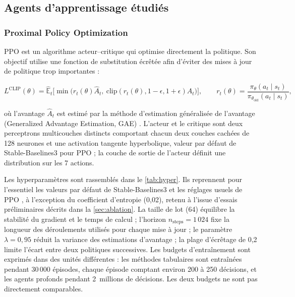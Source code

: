 \documentclass[11pt,a4paper]{article}
\newif\ifrevmarks
\newcommand{\revtag}[1]{\ifrevmarks\textsuperscript{\textcolor{red!70!black}{\scriptsize[#1]}}\fi}
\newcommand{\rev}[2]{\ifrevmarks{\color{revcolor}#2}\revtag{#1}\else#2\fi}
\newenvironment{revbloc}[1]{\par\ifrevmarks\color{revcolor}\noindent\revtag{#1}\ \fi}{\par}
\begin{document}
\subsection{Agents d'apprentissage étudiés}
\label{sec:agents}

\subsubsection{Proximal Policy Optimization}

PPO \cite{JohnSchulman2017} est un algorithme acteur--critique qui optimise directement la politique. Son objectif utilise une fonction de substitution écrêtée afin d'éviter des mises à jour de politique trop importantes :

\begin{equation}
L^{\mathrm{CLIP}}(\theta) = \hat{\mathbb{E}}_t \Big[ \min \big( r_t(\theta)\hat{A}_t,\ \mathrm{clip}(r_t(\theta), 1-\epsilon, 1+\epsilon)\hat{A}_t \big) \Big],
\qquad r_t(\theta) = \frac{\pi_\theta(a_t \mid s_t)}{\pi_{\theta_{\mathrm{old}}}(a_t \mid s_t)} ,
\end{equation}

\rev{Bibliographie}{où l'avantage $\hat{A}_t$ est estimé par la méthode d'estimation généralisée de l'avantage (Generalized Advantage Estimation, GAE) \cite{Schulman2016GAE}.} L'acteur et le critique sont deux perceptrons multicouches distincts comportant chacun deux couches cachées de 128 neurones et une activation tangente hyperbolique, valeur par défaut de Stable-Baselines3 pour PPO ; la couche de sortie de l'acteur définit une distribution sur les 7 actions.

\begin{revbloc}{M12}
Les hyperparamètres sont rassemblés dans le \cref{tab:hyper}. Ils reprennent pour l'essentiel les valeurs par défaut de Stable-Baselines3 et les réglages usuels de PPO \cite{JohnSchulman2017}, à l'exception du coefficient d'entropie (0,02), retenu à l'issue d'essais préliminaires décrits dans la \cref{sec:ablation}. La taille de lot (64) équilibre la stabilité du gradient et le temps de calcul ; l'horizon $n_{\mathrm{steps}} = 1\,024$ fixe la longueur des déroulements utilisés pour chaque mise à jour ; le paramètre $\lambda = 0{,}95$ réduit la variance des estimations d'avantage ; la plage d'écrêtage de 0,2 limite l'écart entre deux politiques successives. Les budgets d'entraînement sont exprimés dans des unités différentes : les méthodes tabulaires sont entraînées pendant 30\,000 épisodes, chaque épisode comptant environ 200 à 250 décisions, et les agents profonds pendant 2~millions de décisions. Les deux budgets ne sont pas directement comparables.
\end{revbloc}
\end{document}
